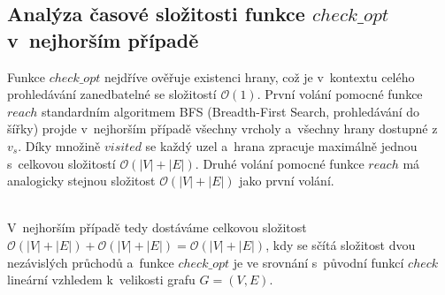 \documentclass[a4paper, 11pt]{article}
\begin{document}
\begin{algorithm}

\nl {}

\vspace{1em}

\nl {}
\end{algorithm}

\subsection*{Analýza časové složitosti funkce $check\_opt$ v~nejhorším případě}

Funkce $check\_opt$ nejdříve ověřuje existenci hrany, což je v~kontextu celého prohledávání zanedbatelné se složitostí $\mathcal{O} (1)$.
První volání pomocné funkce $reach$ standardním algoritmem BFS (Breadth-First Search, prohledávání do šířky) projde v~nejhorším případě všechny vrcholy a~všechny hrany dostupné z~$v_s$.
Díky množině $visited$ se každý uzel a~hrana zpracuje maximálně jednou s~celkovou složitostí $\mathcal{O} (|V| + |E|)$.
Druhé volání pomocné funkce $reach$ má analogicky stejnou složitost $\mathcal{O} (|V| + |E|)$ jako první volání.

\noindent \\ V~nejhorším případě tedy dostáváme celkovou složitost $\mathcal{O} (|V| + |E|) + \mathcal{O} (|V| + |E|) = \mathcal{O} (|V| + |E|)$, kdy se sčítá složitost dvou nezávislých průchodů a~funkce $check\_opt$ je ve srovnání s~původní funkcí $check$ lineární vzhledem k~velikosti grafu $G = (V, E)$.
\end{document}
